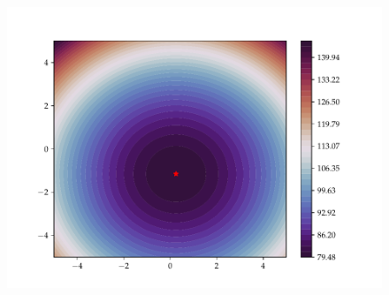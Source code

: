 \begin{figure}[h]
    \begin{minipage}[b]{0.49\textwidth}
      \includegraphics[trim=1.2cm 0.7cm 2cm 1cm,clip,width=\textwidth]{Figures/coco/f1.pdf}
     \end{minipage}
     \hfill
  \label{f1_reg_2D}
\end{figure}

